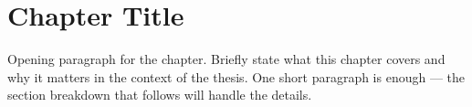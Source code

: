 \documentclass[../../thesis.tex]{subfiles}
\begin{document}
\chapter{Chapter Title}
\label{ch:N}

\chaptertitleblock
  {\QuoteChN}
  {\AttribChN}
  {Opening paragraph for the chapter. Briefly state what this chapter covers and why it matters
   in the context of the thesis. One short paragraph is enough — the section breakdown that
   follows will handle the details.}



\end{document}

